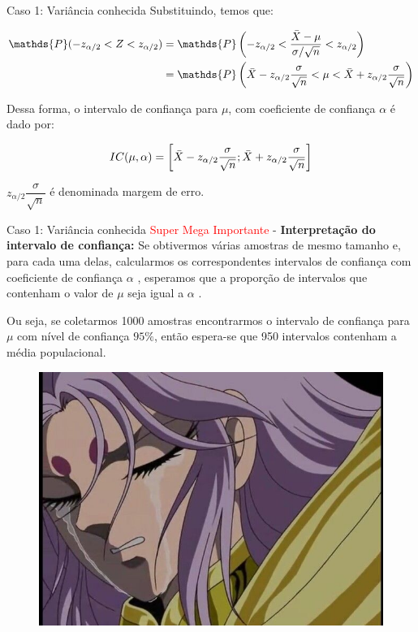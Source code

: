 \begin{frame}{Caso 1: Variância conhecida}
    Substituindo, temos que:

    \begin{align*}
        \mathds{P}(-z_{\alpha/2} <Z < z_{\alpha/2}) &= \mathds{P}\left(-z_{\alpha/2} < \dfrac{\Bar{X} - \mu}{\sigma/\sqrt{n}} < z_{\alpha/2}\right)\\
        &= \mathds{P}\left(\Bar{X} -z_{\alpha/2}\dfrac{\sigma}{\sqrt{n}} < \mu < \Bar{X} + z_{\alpha/2}\dfrac{\sigma}{\sqrt{n}}\right)
    \end{align*}

    Dessa forma, o intervalo de confiança para $\mu$, com coeficiente de confiança $\alpha$ é dado por:

    $$IC(\mu, \alpha) = \left[ \Bar{X} - z_{\alpha/2}\dfrac{\sigma}{\sqrt{n}} ; \Bar{X}+ z_{\alpha/2}\dfrac{\sigma}{\sqrt{n}}\right]$$

    $ z_{\alpha/2}\dfrac{\sigma}{\sqrt{n}}$ é denominada margem de erro.
\end{frame}

\begin{frame}{Caso 1: Variância conhecida}
    \textcolor{red}{Super Mega Importante} - \textbf{Interpretação do intervalo de confiança:} Se obtivermos várias
amostras de mesmo tamanho e, para cada uma delas, calcularmos os
correspondentes intervalos de confiança com coeficiente de confiança $\alpha$ ,
esperamos que a proporção de intervalos que contenham o valor de $\mu$ seja igual
a $\alpha$ .

Ou seja, se coletarmos 1000 amostras encontrarmos o intervalo de confiança para $\mu$ com nível de confiança $95\%$, então espera-se que 950 intervalos contenham a média populacional.  
\pause

\vspace{10px}

\begin{figure}
    \centering
    \includegraphics[width=0.4\linewidth]{figures/mu_crying.jpg}
\end{figure}
\end{frame}

